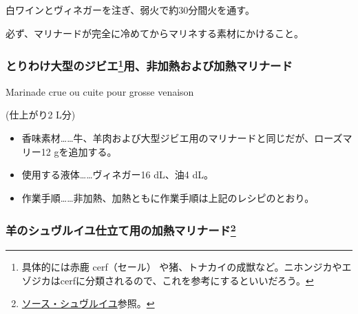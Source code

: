\begin{recette}
\begin{itemize}
  白ワインとヴィネガーを注ぎ、弱火で約30分間火を通す。

  必ず、マリナードが完全に冷めてからマリネする素材にかけること。
\end{itemize}

\atoaki{}

\hypertarget{marinade-crue-ou-cuite-pour-grosse-venaison}{%
\subsubsection[とりわけ大型のジビエ用、非加熱および加熱マリナード]{\texorpdfstring{とりわけ大型のジビエ\footnote{具体的には赤鹿
  cerf（セール）
  や猪、トナカイの成獣など。ニホンジカやエゾジカはcerfに分類されるので、これを参考にするといいだろう。}用、非加熱および加熱マリナード}{とりわけ大型のジビエ用、非加熱および加熱マリナード}}\label{marinade-crue-ou-cuite-pour-grosse-venaison}}

\begin{frsubenv}

Marinade crue ou cuite pour grosse venaison

\end{frsubenv}


(仕上がり2 L分)

\begin{itemize}
\item
  香味素材\ldots{}\ldots{}牛、羊肉および大型ジビエ用のマリナードと同じだが、ローズマリー12
  gを追加する。
\item
  使用する液体\ldots{}\ldots{}ヴィネガー16 dL、油4 dL。
\item
  作業手順\ldots{}\ldots{}非加熱、加熱ともに作業手順は上記のレシピのとおり。
\end{itemize}

\atoaki{}

\hypertarget{marinade-cuite-pour-le-mouton-en-chevreuil}{%
\subsubsection[羊のシュヴルイユ仕立て用の加熱マリナード]{\texorpdfstring{羊のシュヴルイユ仕立て用の加熱マリナード\footnote{\protect\hyperlink{sauce-chevreuil}{ソース・シュヴルイユ}参照。}}{羊のシュヴルイユ仕立て用の加熱マリナード}}\label{marinade-cuite-pour-le-mouton-en-chevreuil}}


\end{recette}
